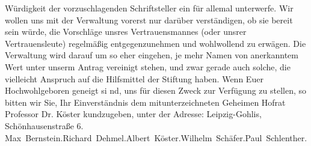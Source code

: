 \begin{ledgroupsized}[t]{13cm}
               Würdigkeit der vorzuschlagenden Schriftsteller ein für allemal unterwerfe. Wir wollen
               uns mit der Verwaltung vorerst nur darüber verständigen, ob sie  bereit sein würde, die Vorschläge unsres Vertrauensmannes
               (oder unsrer Vertrauensleute) regelmäßig entgegenzunehmen und wohlwollend zu erwägen.
               Die Verwaltung wird darauf um so eher eingehen, je mehr Namen von anerkanntem Wert
               unter unserm Antrag vereinigt stehen, und zwar gerade auch solche, die vielleicht
               Anspruch auf die Hilfsmittel der Stiftung haben.\pend
           \pstart
           Wenn Euer Hochwohlgeboren geneigt si nd, uns für diesen Zweck  zur Verfügung zu stellen, so bitten wir Sie, Ihr
               Einverständnis  dem
               mitunterzeichneten Geheimen Hofrat Professor Dr. Köster kundzugeben, unter der Adresse: Leipzig-Gohlis, Schönhausenstraße 6. \pend
           \pstart \spacefill\mbox{Max Bernstein.}\spacefill\mbox{Richard Dehmel.}\spacefill\mbox{Albert Köster.}\spacefill\mbox{Wilhelm Schäfer.}\spacefill\mbox{Paul Schlenther.}\pend{}
         
         \endnumbering{}\end{ledgroupsized}  \newcommand{\dateiname}{L02084}\newcommand{\titel}{Richard Dehmel an Arthur Schnitzler, 14. 8. 1912}\newcommand{\editorInnen}{ Martin Anton Müller und Gerd-Hermann Susen}
      